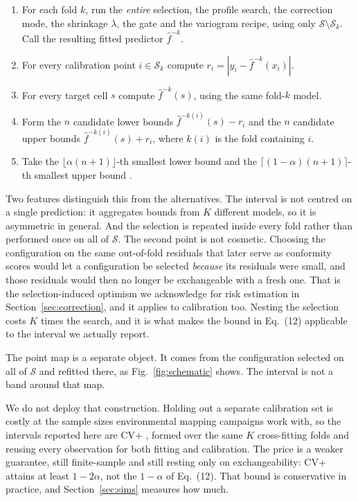 \documentclass[preprint,12pt,authoryear]{elsarticle}
\begin{document}
\begin{enumerate}\itemsep2pt
\item For each fold $k$, run the \emph{entire} selection, the profile search,
the correction mode, the shrinkage $\lambda$, the gate and the variogram
recipe, using only $\mathcal{S}\setminus\mathcal{S}_k$. Call the resulting
fitted predictor $\hat f^{-k}$.
\item For every calibration point $i\in\mathcal{S}_k$ compute
$r_i = |y_i - \hat f^{-k}(x_i)|$.
\item For every target cell $s$ compute $\hat f^{-k}(s)$, using the same
fold-$k$ model.
\item Form the $n$ candidate lower bounds $\hat f^{-k(i)}(s) - r_i$ and the $n$
candidate upper bounds $\hat f^{-k(i)}(s) + r_i$, where $k(i)$ is the fold
containing $i$.
\item Take the $\lfloor \alpha(n+1)\rfloor$-th smallest lower bound and the
$\lceil (1-\alpha)(n+1)\rceil$-th smallest upper bound
\citep{barber2021}.
\end{enumerate}

Two features distinguish this from the alternatives. The interval is not
centred on a single prediction: it aggregates bounds from $K$ different models,
so it is asymmetric in general. And the selection is repeated inside every fold
rather than performed once on all of $\mathcal{S}$. The second point is not
cosmetic. Choosing the configuration on the same out-of-fold residuals that
later serve as conformity scores would let a configuration be selected
\emph{because} its residuals were small, and those residuals would then no
longer be exchangeable with a fresh one. That is the selection-induced optimism
we acknowledge for risk estimation in Section~\ref{sec:correction}, and it applies
to calibration too. Nesting the selection costs $K$ times the search, and it is
what makes the bound in Eq.~(12) applicable to the interval we actually report.

The point map is a separate object. It comes from the configuration selected on
all of $\mathcal{S}$ and refitted there, as Fig.~\ref{fig:schematic} shows. The
interval is not a band around that map.

We do not deploy that construction. Holding out a separate calibration set is
costly at the sample sizes environmental mapping campaigns work with, so the
intervals
reported here are CV+ \citep{barber2021}, formed over the same $K$ cross-fitting
folds and reusing every observation for both fitting and calibration. The price
is a weaker guarantee, still finite-sample and still resting only on
exchangeability: CV+ attains at least $1-2\alpha$, not the $1-\alpha$ of
Eq.~(12). That bound is conservative in practice, and
Section~\ref{sec:sims} measures how much.
\end{document}
